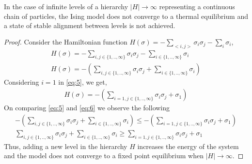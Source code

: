 \documentclass{article}
\begin{document}
\begin{prop}{2}\label{two}
    In the case of infinite levels of a hierarchy $|H| \to \infty$ representing a continuous chain of particles, the Ising model does not converge to a thermal equilibrium and a state of stable alignment between levels is not achieved.  
\end{prop}
\begin{proof}
    Consider the Hamiltonian function $H(\sigma) = - \underset{<i,j>}{\sum} \sigma_{i}\sigma_{j} - \underset{i}{\sum}\sigma_{i}$,\\
    \begin{gather}
        H(\sigma) = - \underset{i,j \in \{1,..,\infty\}}{\sum}\sigma_{i}\sigma_{j} - \underset{i \in \{1,..,\infty\}}{\sum}\sigma_{i} \nonumber \\
        H(\sigma) = - (\underset{i,j \in \{1,..,\infty\}}{\sum}\sigma_{i}\sigma_{j} + \underset{i \in \{1,..,\infty\}}{\sum}\sigma_{i}) \label{eq:5}
    \end{gather}
    Considering $i = 1$ in \autoref{eq:5}, we get,
    \begin{gather}
        H(\sigma) = - (\underset{i=1,j \in \{1,..,\infty\}}{\sum}\sigma_{i}\sigma_{j} + \sigma_{1}) \label{eq:6}
    \end{gather}
    On comparing \autoref{eq:5} and \autoref{eq:6} we observe the following
    \begin{gather}
        - (\underset{i,j \in \{1,..,\infty\}}{\sum}\sigma_{i}\sigma_{j} + \underset{i \in \{1,..,\infty\}}{\sum}\sigma_{i}) \leq - (\underset{i=1,j \in \{1,..,\infty\}}{\sum}\sigma_{i}\sigma_{j} + \sigma_{1}) \nonumber \\
        \underset{i,j \in \{1,..,\infty\}}{\sum}\sigma_{i}\sigma_{j} + \underset{i \in \{1,..,\infty\}}{\sum}\sigma_{i} \geq \underset{i=1,j \in \{1,..,\infty\}}{\sum}\sigma_{i}\sigma_{j} + \sigma_{1} \nonumber
    \end{gather}
    Thus, adding a new level in the hierarchy $H$ increases the energy of the system and the model does not converge to a fixed point equilibrium when $|H| \to \infty$.
\end{proof}
\end{document}
